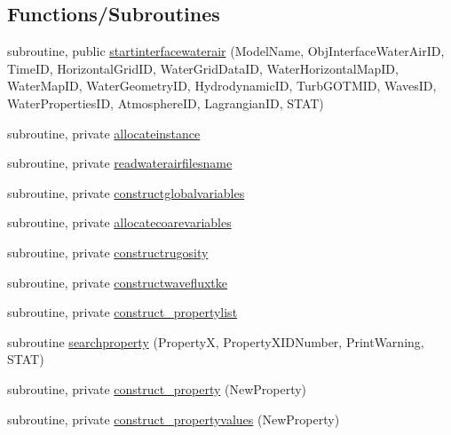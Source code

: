 \subsection*{Functions/\+Subroutines}
\begin{DoxyCompactItemize}
\item 
subroutine, public \mbox{\hyperlink{namespacemoduleinterfacewaterair_a1d15121ff2d6a7ec0e45dffd0506037a}{startinterfacewaterair}} (Model\+Name, Obj\+Interface\+Water\+Air\+ID, Time\+ID, Horizontal\+Grid\+ID, Water\+Grid\+Data\+ID, Water\+Horizontal\+Map\+ID, Water\+Map\+ID, Water\+Geometry\+ID, Hydrodynamic\+ID, Turb\+G\+O\+T\+M\+ID, Waves\+ID, Water\+Properties\+ID, Atmosphere\+ID, Lagrangian\+ID, S\+T\+AT)
\item 
subroutine, private \mbox{\hyperlink{namespacemoduleinterfacewaterair_aac230f23ec15f17b04185abc9c918ba1}{allocateinstance}}
\item 
subroutine, private \mbox{\hyperlink{namespacemoduleinterfacewaterair_a8a015dc245f72a1e32671973e4ef4538}{readwaterairfilesname}}
\item 
subroutine, private \mbox{\hyperlink{namespacemoduleinterfacewaterair_aade4da5319abf6cc9115d08e4cfb448b}{constructglobalvariables}}
\item 
subroutine, private \mbox{\hyperlink{namespacemoduleinterfacewaterair_ad1e0a14ea6e30cf93be9661a4a71a0f7}{allocatecoarevariables}}
\item 
subroutine, private \mbox{\hyperlink{namespacemoduleinterfacewaterair_ae5a4815896d07094361faa53fb69aa03}{constructrugosity}}
\item 
subroutine, private \mbox{\hyperlink{namespacemoduleinterfacewaterair_af474bb755901d845cb8a0f3efa8ffcbe}{constructwavefluxtke}}
\item 
subroutine, private \mbox{\hyperlink{namespacemoduleinterfacewaterair_a0102df656b49a2adcbef76f5a3a9e6d0}{construct\+\_\+propertylist}}
\item 
subroutine \mbox{\hyperlink{namespacemoduleinterfacewaterair_a9b32248d73ce68c55c1d8671b779f48a}{searchproperty}} (PropertyX, Property\+X\+I\+D\+Number, Print\+Warning, S\+T\+AT)
\item 
subroutine, private \mbox{\hyperlink{namespacemoduleinterfacewaterair_a8f499486725a26a9dcb5b2bd07ba3af9}{construct\+\_\+property}} (New\+Property)
\item 
subroutine, private \mbox{\hyperlink{namespacemoduleinterfacewaterair_a564ac080f485dff9d0cc2f92d398f795}{construct\+\_\+propertyvalues}} (New\+Property)
\item 

\end{DoxyCompactItemize}
